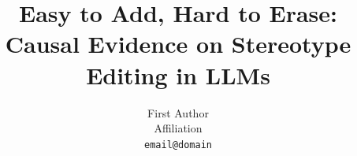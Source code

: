 \documentclass[11pt]{article}
\title{Easy to Add, Hard to Erase: Causal Evidence on Stereotype Editing in LLMs}
\author{First Author \\
  Affiliation \\
  \texttt{email@domain}}
\begin{document}
\maketitle

\begin{abstract}

\end{abstract}




\end{document}
